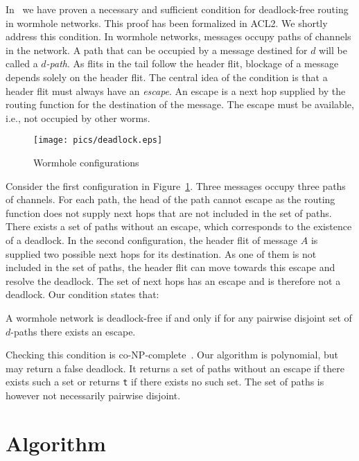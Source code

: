 \documentclass[submission,copyright]{eptcs}
\begin{document}
In~\cite{verbeekschmaltz:tpds10} we have proven a necessary and sufficient condition for deadlock-free routing in wormhole networks. This proof has been formalized in ACL2. We shortly address this condition. In wormhole networks, messages occupy paths of channels in the network. A path that can be occupied by a message destined for $d$ will be called a \emph{$d$-path}. As flits in the tail follow the header flit, blockage of a message depends solely on the header flit. The central idea of the condition is that a header flit must always have an \emph{escape}. An escape is a next hop supplied by the routing function for the destination of the message. The escape must be available, i.e., not occupied by other worms.

\begin{figure}[hbpt]
\centering
\texttt{[image: pics/deadlock.eps]}
\caption{Wormhole configurations}
\label{fig:deadlock}
\end{figure}

Consider the first configuration in Figure~\ref{fig:deadlock}. Three messages occupy three paths of channels. For each path, the head of the path cannot escape as the routing function does not supply next hops that are not included in the set of paths. There exists a set of paths without an escape, which corresponds to the existence of a deadlock. In the second configuration, the header flit of message $A$ is supplied two possible next hops for its destination. As one of them is not included in the set of paths, the header flit can move towards this escape and resolve the deadlock. The set of next hops has an escape and is therefore not a deadlock.
Our condition states that:
\begin{center}
A wormhole network is deadlock-free if and only if for any pairwise disjoint set of $d$-paths there exists an escape.
\end{center}

Checking this condition is co-NP-complete~\cite{verbeekschmaltz:tpds10}. Our algorithm is polynomial, but may return a false deadlock. It returns a set of paths without an escape if there exists such a set or returns {\tt t} if there exists no such set. The set of paths is however not necessarily pairwise disjoint.

\section{Algorithm}\label{sec:algo}
\end{document}
